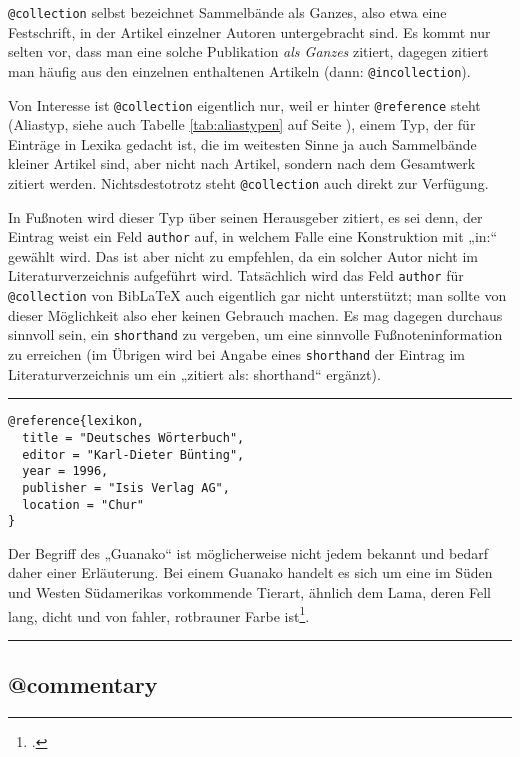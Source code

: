 \documentclass[11pt,a4paper,DIV=calc]{scrartcl}
\newcommand\software[1]{\textsf{#1}}
\newcommand\Biblatex{\software{Bib\LaTeX{}}\xspace}
\newenvironment{rubexample}{\par\vspace{\baselineskip}\hrule\par\begin{refsection}}{\end{refsection}\par\hrule\par\vspace{\baselineskip}}
\begin{document}
\verb+@collection+ selbst bezeichnet Sammelbände als Ganzes, also etwa
eine Festschrift, in der Artikel einzelner Autoren untergebracht
sind. Es kommt nur selten vor, dass man eine solche Publikation
\emph{als Ganzes} zitiert, dagegen zitiert man häufig aus den
einzelnen enthaltenen Artikeln (dann:
\verb+@incollection+).

Von Interesse ist \verb+@collection+ eigentlich nur, weil er hinter
\verb+@reference+ steht (Aliastyp, siehe auch Tabelle
\ref{tab:aliastypen} auf Seite \pageref{tab:aliastypen}), einem Typ,
der für Einträge in Lexika gedacht ist, die im weitesten Sinne ja auch
Sammelbände kleiner Artikel sind, aber nicht nach Artikel, sondern
nach dem Gesamtwerk zitiert werden. Nichtsdestotrotz steht
\verb+@collection+ auch direkt zur Verfügung.

In Fußnoten wird dieser Typ über seinen Herausgeber zitiert, es sei
denn, der Eintrag weist ein Feld \verb+author+ auf, in welchem Falle
eine Konstruktion mit „in:“ gewählt wird. Das ist aber nicht zu
empfehlen, da ein solcher Autor nicht im Literaturverzeichnis
aufgeführt wird. Tatsächlich wird das Feld \verb+author+ für
\verb+@collection+ von \Biblatex auch eigentlich gar nicht
unterstützt; man sollte von dieser Möglichkeit also eher keinen
Gebrauch machen. Es mag dagegen durchaus sinnvoll sein, ein
\verb+shorthand+ zu vergeben, um eine sinnvolle Fußnoteninformation zu
erreichen (im Übrigen wird bei Angabe eines \verb+shorthand+ der
Eintrag im Literaturverzeichnis um ein „zitiert als: shorthand“ ergänzt).

\begin{rubexample}
\begin{verbatim}
@reference{lexikon,
  title = "Deutsches Wörterbuch",
  editor = "Karl-Dieter Bünting",
  year = 1996,
  publisher = "Isis Verlag AG",
  location = "Chur"
}
\end{verbatim}

Der Begriff des „Guanako“ ist möglicherweise nicht jedem bekannt und
bedarf daher einer Erläuterung. Bei einem Guanako handelt es sich um
eine im Süden und Westen Südamerikas vorkommende Tierart, ähnlich dem
Lama, deren Fell lang, dicht und von fahler, rotbrauner Farbe
ist\footcite[480]{lexikon}.

\printbibliography
\end{rubexample}

\subsection{@commentary}
\end{document}

